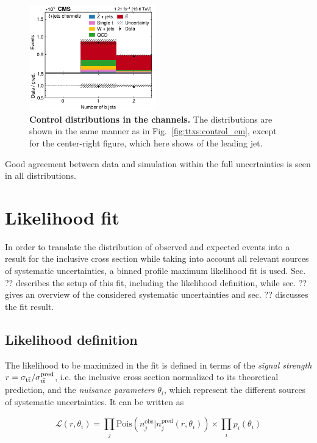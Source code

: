 \begin{figure}[!p]
\hfill
\includegraphics[width=0.49\textwidth]{figures/ttxs/nbtag_lj.pdf}
\caption{
   \textbf{Control distributions in the \ljets channels.} The distributions are shown in the same manner as in Fig.~\ref{fig:ttxs:control_em}, except for the center-right figure, which here shows \abseta of the leading jet.
}
\label{fig:ttxs:control_ljets}
\end{figure}

Good agreement between data and simulation within the full uncertainties is seen in all distributions.

\section{Likelihood fit}
\label{sec:ttxs:fit}

In order to translate the distribution of observed and expected events into a result for the inclusive \ttbar cross section while taking into account all relevant sources of systematic uncertainties, a binned profile maximum likelihood fit is used. Sec. ?? describes the setup of this fit, including the likelihood definition, while sec. ?? gives an overview of the considered systematic uncertainties and sec. ?? discusses the fit result.

\subsection{Likelihood definition}

The likelihood to be maximized in the fit is defined in terms of the \textit{signal strength} $r = \sigma_{\mathrm{t \bar{t}}} / \sigma_{\mathrm{t \bar{t}}}^{\text{pred}}$, i.e. the inclusive \ttbar cross section normalized to its theoretical prediction, and the \textit{nuisance parameters} $\theta_i$, which represent the different sources of systematic uncertainties. It can be written as

\begin{equation}
\label{eq:ttxs:likelihood}
    \mathcal{L} (r, \theta_i) = \prod_j \mathrm{Pois} \left(n_j^{\text{obs}} | n_j^{\text{pred}} (r, \theta_i) \right) \times \prod_i p_i ( \theta_i )
\end{equation}

